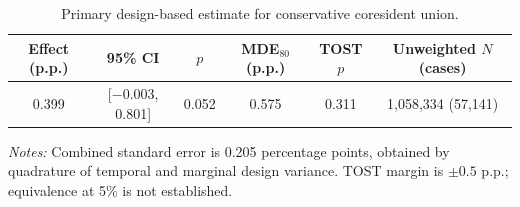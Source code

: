 \begin{table}[!htbp]
\centering
\caption{Primary design-based estimate for conservative coresident union.}
\label{tab:union_primary}
\begingroup\footnotesize
\begin{tabular}{@{}cccccc@{}}
\toprule
Effect (p.p.) & 95\% CI & $p$ & MDE$_{80}$ (p.p.) & TOST $p$ & Unweighted $N$ (cases) \\
\midrule
0.399 & [$-0.003$, 0.801] & 0.052 & 0.575 & 0.311 & 1,058,334 (57,141) \\
\bottomrule
\end{tabular}
\par\smallskip
\begin{minipage}{0.96\linewidth}\footnotesize
\emph{Notes:} Combined standard error is 0.205 percentage points, obtained by
quadrature of temporal and marginal design variance. TOST margin is $\pm0.5$ p.p.;
equivalence at 5\% is not established.
\end{minipage}
\endgroup
\end{table}
